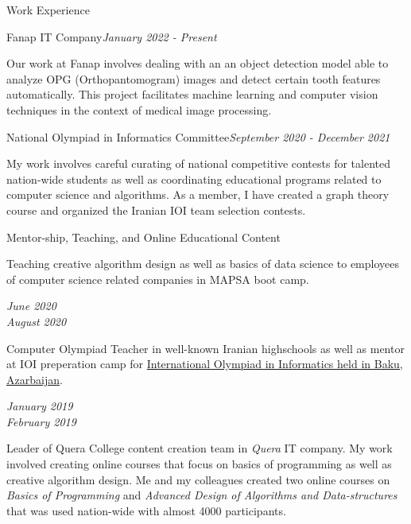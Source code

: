 \documentclass{resume} %
\begin{document}
\begin{rSection}{Work Experience}
\begin{small}
\begin{rSubsection}{Fanap IT Company}{\textcolor{Black!70}{\it January 2022 - Present}}{}{}
\itemsep -2pt
\item Our work at Fanap involves dealing with an an object detection model able to analyze OPG (Orthopantomogram) images and detect certain tooth features automatically. This project facilitates machine learning and computer vision techniques in the context of medical image processing.
\end{rSubsection}
\begin{rSubsection}{National Olympiad in Informatics Committee}{\textcolor{Black!70}{\it September 2020 - December 2021}}{}{}
\itemsep -2pt
\item My work involves careful curating of national competitive contests for talented nation-wide students as well as coordinating educational programs related to computer science and algorithms. As a member, I have created a graph theory course and organized the Iranian IOI team selection contests.
\end{rSubsection}
\begin{rSubsection}{Mentor-ship, Teaching, and Online Educational Content}{}{}{}
\itemsep -1pt
\item \parbox{15cm}{Teaching creative algorithm design as well as basics of data science to employees of computer science related companies in MAPSA boot camp.} \hfill
\parbox{3cm}{\begin{flushright}
\begin{center}
\textcolor{Black!70}{\it June 2020 \\ August 2020}
\end{center}
\end{flushright}}
\item \parbox{15cm}{Computer Olympiad Teacher in well-known Iranian highschools as well as mentor at IOI preperation camp for \href{https://ioi2019.az/}{International Olympiad in Informatics held in Baku, Azarbaijan}.} \hfill 
\parbox{3cm}{\begin{flushright}
\begin{center}
\textcolor{Black!70}{\it January 2019 \\ February 2019}
\end{center}
\end{flushright}}
\item \parbox{15cm}{Leader of Quera College content creation team in {\it Quera} IT company. My work involved creating online courses that focus on basics of programming as well as creative algorithm design. Me and my colleagues created two online courses on {\it Basics of Programming} and {\it Advanced Design of Algorithms and Data-structures} that was used nation-wide with almost 4000 participants.} \hfill 

\end{rSubsection}
\end{small}
\end{rSection}
\end{document}
